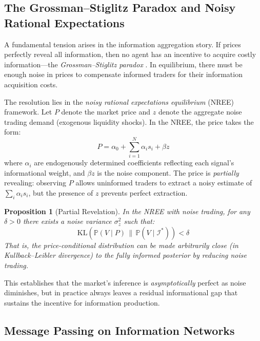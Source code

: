 \documentclass[12pt,a4paper]{article}
\newtheorem{proposition}[theorem]{Proposition}
\theoremstyle{definition}
\newcommand{\Prob}{\mathbb{P}}
\newcommand{\I}{\mathcal{I}}
\newcommand{\KL}{\mathrm{KL}}
\begin{document}
\subsection{The Grossman--Stiglitz Paradox and Noisy Rational Expectations}

A fundamental tension arises in the information aggregation story. If prices perfectly reveal all information, then no agent has an incentive to acquire costly information---the \emph{Grossman--Stiglitz paradox} \citep{grossman1980}. In equilibrium, there must be enough noise in prices to compensate informed traders for their information acquisition costs.

The resolution lies in the \emph{noisy rational expectations equilibrium} (NREE) framework. Let $P$ denote the market price and $z$ denote the aggregate noise trading demand (exogenous liquidity shocks). In the NREE, the price takes the form:
\begin{equation}\label{eq:nree}
    P = \alpha_0 + \sum_{i=1}^{N} \alpha_i s_i + \beta z
\end{equation}
where $\alpha_i$ are endogenously determined coefficients reflecting each signal's informational weight, and $\beta z$ is the noise component. The price is \emph{partially} revealing: observing $P$ allows uninformed traders to extract a noisy estimate of $\sum_i \alpha_i s_i$, but the presence of $z$ prevents perfect extraction.

\begin{proposition}[Partial Revelation]\label{prop:partial}
In the NREE with noise trading, for any $\delta > 0$ there exists a noise variance $\sigma_z^2$ such that:
\begin{equation}
    \KL\left(\Prob(V \mid P) \,\|\, \Prob(V \mid \I^*)\right) < \delta
\end{equation}
That is, the price-conditional distribution can be made arbitrarily close (in Kullback--Leibler divergence) to the fully informed posterior by reducing noise trading.
\end{proposition}

This establishes that the market's inference is \emph{asymptotically} perfect as noise diminishes, but in practice always leaves a residual informational gap that sustains the incentive for information production.

\subsection{Message Passing on Information Networks}
\end{document}
